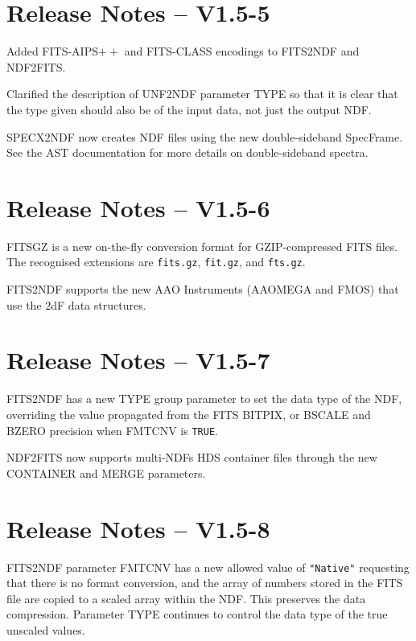 \documentclass[twoside,11pt]{article}
\newcommand{\htmlref}[2]{#1}
\begin{document}
\section{Release Notes -- V1.5-5}

Added FITS-AIPS$++$ and FITS-CLASS encodings to 
\htmlref{FITS2NDF}{FITS2NDF} and \htmlref{NDF2FITS}{NDF2FITS}.

Clarified the description of \htmlref{UNF2NDF}{UNF2NDF} parameter TYPE
so that it is clear that the type given should also be of the input
data, not just the output NDF.

\htmlref{SPECX2NDF}{SPECX2NDF} now creates NDF files using the new
double-sideband SpecFrame.  See the AST documentation for more details
on double-sideband spectra.

\section{Release Notes -- V1.5-6}

FITSGZ is a new on-the-fly conversion format for GZIP-compressed FITS
files.  The recognised extensions are \texttt{fits.gz}, \texttt{fit.gz}, and
\texttt{fts.gz}.

FITS2NDF supports the new AAO Instruments (AAOMEGA and FMOS) that use
the 2dF data structures.
  
\section{Release Notes -- V1.5-7}

\htmlref{FITS2NDF}{FITS2NDF} has a new TYPE group parameter to set the
data type of the NDF, overriding the value propagated from the FITS
BITPIX, or BSCALE and BZERO precision when FMTCNV is \texttt{TRUE}.

\htmlref{NDF2FITS}{NDF2FITS} now supports multi-NDFs HDS container files
through the new CONTAINER and MERGE parameters.

\section{Release Notes -- V1.5-8}

\htmlref{FITS2NDF}{FITS2NDF} parameter FMTCNV has a new allowed value
of \texttt{"Native"} requesting that there is no format conversion, and
the array of numbers stored in the FITS file are copied to a scaled array
within the NDF.  This preserves the data compression.  Parameter TYPE
continues to control the data type of the true unscaled values.
\end{document}
